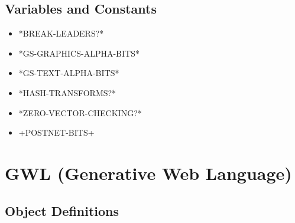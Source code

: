 \documentclass [11pt]{book}
\begin{document}
\subsection{Variables and Constants}

\label{subsec:variablesandconstants}



\begin{itemize}

\item {}*BREAK-LEADERS?*

\item {}*GS-GRAPHICS-ALPHA-BITS*

\item {}*GS-TEXT-ALPHA-BITS*

\item {}*HASH-TRANSFORMS?*

\item {}*ZERO-VECTOR-CHECKING?*

\item {}+POSTNET-BITS+

\end{itemize}





\section{GWL (Generative Web Language)}

\label{sec:gwl(generativeweblanguage)}





\subsection{Object Definitions}

\label{subsec:objectdefinitions}
\end{document}

